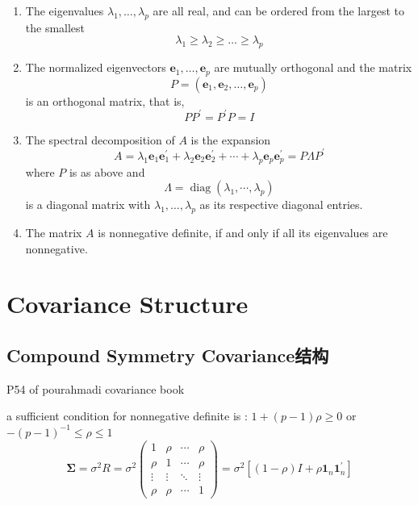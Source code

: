 \documentclass[
]{book}
\theoremstyle{definition}
\theoremstyle{definition}
\theoremstyle{definition}
\theoremstyle{remark}
\begin{document}
\begin{enumerate}
\def\labelenumi{(\alph{enumi})}
\item
  The eigenvalues \(\lambda_{1}, \ldots, \lambda_{p}\) are all real, and can be ordered from the largest
  to the smallest
  \[
  \lambda_{1} \geq \lambda_{2} \geq \ldots \geq \lambda_{p}
  \]
\item
  The normalized eigenvectors \(\mathbf{e}_{1}, \ldots, \mathbf{e}_{p}\) are mutually orthogonal and the matrix
  \[
  P=\left(\mathbf{e}_{1}, \mathbf{e}_{2}, \ldots, \mathbf{e}_{p}\right)
  \]
  is an orthogonal matrix, that is,
  \[
  P P^{\prime}=P^{\prime} P=I
  \]
\item
  The spectral decomposition of \(A\) is the expansion
  \[
  A=\lambda_{1} \mathbf{e}_{1} \mathbf{e}_{1}^{\prime}+\lambda_{2} \mathbf{e}_{2} \mathbf{e}_{2}^{\prime}+\cdots+\lambda_{p} \mathbf{e}_{p} \mathbf{e}_{p}^{\prime}=P \Lambda P^{\prime}
  \]
  where \(P\) is as above and
  \[
  \Lambda=\operatorname{diag}\left(\lambda_{1}, \cdots, \lambda_{p}\right)
  \]
  is a diagonal matrix with \(\lambda_{1}, \ldots, \lambda_{p}\) as its respective diagonal entries.
\item
  The matrix \(A\) is nonnegative definite, if and only if all its eigenvalues are
  nonnegative.
\end{enumerate}

\hypertarget{covariance-structure}{%
\section{Covariance Structure}\label{covariance-structure}}

\hypertarget{compound-symmetry-covarianceux7ed3ux6784}{%
\subsection{Compound Symmetry Covariance结构}\label{compound-symmetry-covarianceux7ed3ux6784}}

P54 of pourahmadi covariance book

a sufficient condition for nonnegative definite is : \(1+(p-1) \rho \geq 0\) or \(-(p-1)^{-1} \leq \rho \leq 1\)
\[
\boldsymbol{\Sigma}=\sigma^{2} R=\sigma^{2}\left(\begin{array}{cccc}
1 & \rho & \cdots & \rho \\
\rho & 1 & \cdots & \rho \\
\vdots & \vdots & \ddots & \vdots \\
\rho & \rho & \cdots & 1
\end{array}\right)=\sigma^{2}\left[(1-\rho) I+\rho \mathbf{1}_{n} \mathbf{1}_{n}^{\prime}\right]
\]
\end{document}
